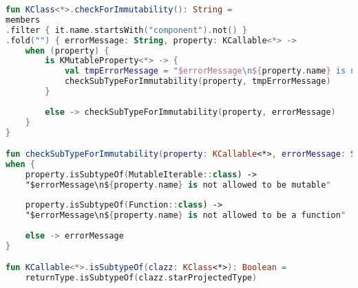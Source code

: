 \begin{lstlisting}[caption={}, label={lst:data-class}, language=Kotlin]
fun KClass<*>.checkForImmutability(): String =
members
.filter { it.name.startsWith("component").not() }
.fold("") { errorMessage: String, property: KCallable<*> ->
	when (property) {
		is KMutableProperty<*> -> {
			val tmpErrorMessage = "$errorMessage\n${property.name} is not allowed to be 'var'"
			checkSubTypeForImmutability(property, tmpErrorMessage)
		}
		
		else -> checkSubTypeForImmutability(property, errorMessage)
	}
}

fun checkSubTypeForImmutability(property: KCallable<*>, errorMessage: String) =
when {
	property.isSubtypeOf(MutableIterable::class) ->
	"$errorMessage\n${property.name} is not allowed to be mutable"
	
	property.isSubtypeOf(Function::class) ->
	"$errorMessage\n${property.name} is not allowed to be a function"
	
	else -> errorMessage
}

fun KCallable<*>.isSubtypeOf(clazz: KClass<*>): Boolean =
	returnType.isSubtypeOf(clazz.starProjectedType)
\end{lstlisting}
